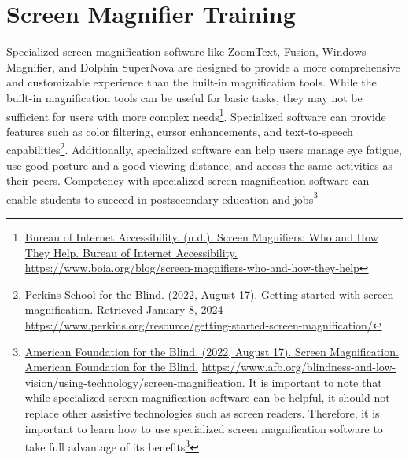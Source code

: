 \pagebreak\hypertarget{appx11}{}\section[Screen Magnifier Training]{Screen Magnifier Training}\label{appx11}
Specialized screen magnification software like ZoomText, Fusion, Windows Magnifier, and Dolphin SuperNova are designed to provide a more comprehensive and customizable experience than the built-in magnification tools. While the built-in magnification tools can be useful for basic tasks, they may not be sufficient for users with more complex needs\footnote{\raggedright \href{https://www.boia.org/blog/screen-magnifiers-who-and-how-they-help}{Bureau of Internet Accessibility. (n.d.). Screen Magnifiers: Who and How They Help. Bureau of Internet Accessibility. } \break\url{https://www.boia.org/blog/screen-magnifiers-who-and-how-they-help}}. Specialized software can provide features such as color filtering, cursor enhancements, and text-to-speech capabilities\footnote{\raggedright \href{https://www.perkins.org/resource/getting-started-screen-magnification/}{Perkins School for the Blind. (2022, August 17). Getting started with screen magnification. Retrieved January 8, 2024} \url{https://www.perkins.org/resource/getting-started-screen-magnification/}}. Additionally, specialized software can help users manage eye fatigue, use good posture and a good viewing distance, and access the same activities as their peers. Competency with specialized screen magnification software can enable students to succeed in postsecondary education and jobs\footnote{\raggedright \href{https://www.afb.org/blindness-and-low-vision/using-technology/screen-magnification}{American Foundation for the Blind. (2022, August 17). Screen Magnification. American Foundation for the Blind.} \break\url{https://www.afb.org/blindness-and-low-vision/using-technology/screen-magnification}. It is important to note that while specialized screen magnification software can be helpful, it should not replace other assistive technologies such as screen readers. Therefore, it is important to learn how to use specialized screen magnification software to take full advantage of its benefits\footnotemark[\value{footnote}]\fnsep\footnote{\raggedright \href{https://nelowvision.com/introduction-to-screen-reading-and-magnification-software-a-comprehensive-guide-to-assistive-technology-assessment/}{Low Vision Center. (n.d.). Introduction to Screen Reading and Magnification Software: A Comprehensive Guide to Assistive Technology Assessment. Low Vision Center. } \break\url{https://nelowvision.com/introduction-to-screen-reading-and-magnification-software-a-comprehensive-guide-to-assistive-technology-assessment/}.
}}
